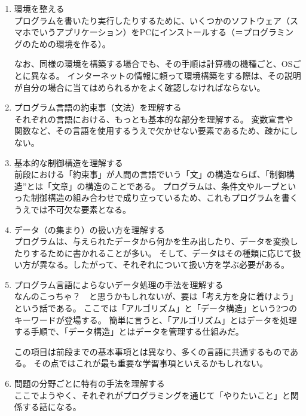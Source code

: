 \documentclass[lualatex,ja=standard,12pt,a4j]{bxjsbook}
\begin{document}
			\begin{enumerate}
				\item 環境を整える\\
				プログラムを書いたり実行したりするために、いくつかのソフトウェア（スマホでいうアプリケーション）をPCにインストールする（＝プログラミングのための環境を作る）。
                
				なお、同様の環境を構築する場合でも、その手順は計算機の機種ごと、OSごとに異なる。
                インターネットの情報に頼って環境構築をする際は、その説明が自分の場合に当てはめられるかをよく確認しなければならない。
				
				\item プログラム言語の約束事（文法）を理解する\\
                それぞれの言語における、もっとも基本的な部分を理解する。
                変数宣言や関数など、その言語を使用するうえで欠かせない要素であるため、疎かにしない。
			
				\item 基本的な制御構造を理解する\\
				前段における「約束事」が人間の言語でいう「文」の構造ならば、「制御構造”とは「文章」の構造のことである。
                プログラムは、条件文やループといった制御構造の組み合わせで成り立っているため、これもプログラムを書くうえでは不可欠な要素となる。
                
				\item データ（の集まり）の扱い方を理解する\\
				プログラムは、与えられたデータから何かを生み出したり、データを変換したりするために書かれることが多い。
                そして、データはその種類に応じて扱い方が異なる。したがって、それぞれについて扱い方を学ぶ必要がある。
				
				\item プログラム言語によらないデータ処理の手法を理解する\\
				なんのこっちゃ？　と思うかもしれないが、要は「考え方を身に着けよう」という話である。
                ここでは「アルゴリズム」と「データ構造」という2つのキーワードが登場する。
                簡単に言うと、「アルゴリズム」とはデータを処理する手順で、「データ構造」とはデータを管理する仕組みだ。
                
                この項目は前段までの基本事項とは異なり、多くの言語に共通するものである。
                その点ではこれが最も重要な学習事項といえるかもしれない。
				
				\item 問題の分野ごとに特有の手法を理解する\\
                ここでようやく、それぞれがプログラミングを通じて「やりたいこと」と関係する話になる。
                

\end{enumerate}
\end{document}
